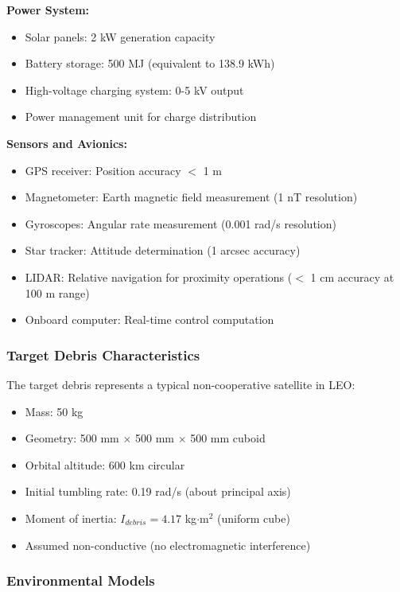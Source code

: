 \documentclass[12pt,a4paper]{article}
\begin{document}
\textbf{Power System:}
\begin{itemize}
\item Solar panels: 2 kW generation capacity
\item Battery storage: 500 MJ (equivalent to 138.9 kWh)
\item High-voltage charging system: 0-5 kV output
\item Power management unit for charge distribution
\end{itemize}

\textbf{Sensors and Avionics:}
\begin{itemize}
\item GPS receiver: Position accuracy $<$ 1 m
\item Magnetometer: Earth magnetic field measurement (1 nT resolution)
\item Gyroscopes: Angular rate measurement (0.001 rad/s resolution)
\item Star tracker: Attitude determination (1 arcsec accuracy)
\item LIDAR: Relative navigation for proximity operations ($<$ 1 cm accuracy at 100 m range)
\item Onboard computer: Real-time control computation
\end{itemize}

\subsubsection{Target Debris Characteristics}

The target debris represents a typical non-cooperative satellite in LEO:
\begin{itemize}
\item Mass: 50 kg
\item Geometry: 500 mm $\times$ 500 mm $\times$ 500 mm cuboid
\item Orbital altitude: 600 km circular
\item Initial tumbling rate: 0.19 rad/s (about principal axis)
\item Moment of inertia: $I_{debris} = 4.17$ kg$\cdot$m$^2$ (uniform cube)
\item Assumed non-conductive (no electromagnetic interference)
\end{itemize}

\subsubsection{Environmental Models}
\end{document}
